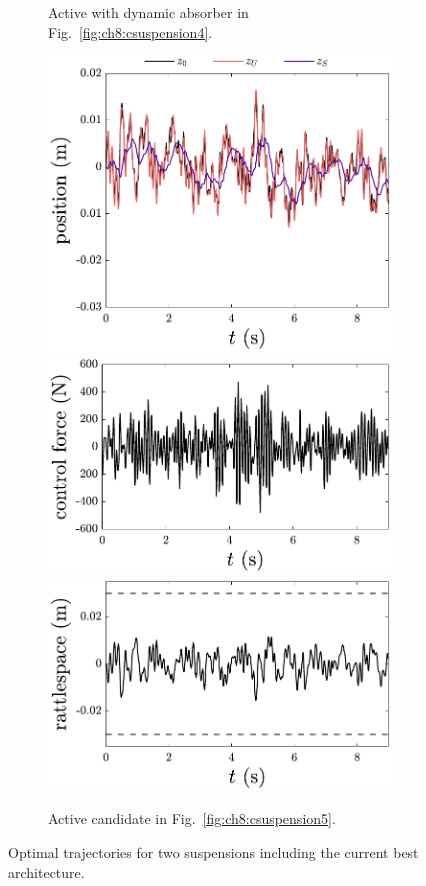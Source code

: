 \begin{figure}
\begin{subfigure}[b]{0.5\textwidth}
\caption{Active with dynamic absorber in Fig.~\ref{fig:ch8:csuspension4}.\label{fig:ch8:results4}}
\end{subfigure}%
\begin{subfigure}[b]{0.5\textwidth}
\centering
\includegraphics[width=\textwidth]{../ch8/figures/design5-position}
\includegraphics[width=\textwidth]{../ch8/figures/design5-control}
\includegraphics[width=\textwidth]{../ch8/figures/design5-rattlespace}
\caption{Active candidate in Fig.~\ref{fig:ch8:csuspension5}.\label{fig:ch8:results5}}
\end{subfigure}%

\caption{Optimal trajectories for two suspensions including the current best architecture.}

\end{figure}